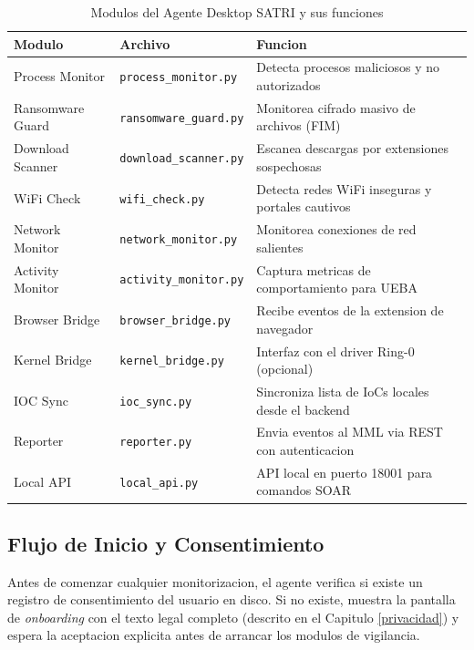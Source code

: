 \documentclass[12pt, a4paper]{report}
\begin{document}
\begin{table}[H]
\centering
\caption{Modulos del Agente Desktop SATRI y sus funciones}
\begin{tabular}{@{}p{3.5cm}p{4cm}p{5cm}@{}}
\toprule
\textbf{Modulo} & \textbf{Archivo} & \textbf{Funcion} \\
\midrule
Process Monitor     & \texttt{process\_monitor.py}   & Detecta procesos maliciosos y no autorizados \\
Ransomware Guard    & \texttt{ransomware\_guard.py}  & Monitorea cifrado masivo de archivos (FIM) \\
Download Scanner    & \texttt{download\_scanner.py}  & Escanea descargas por extensiones sospechosas \\
WiFi Check          & \texttt{wifi\_check.py}        & Detecta redes WiFi inseguras y portales cautivos \\
Network Monitor     & \texttt{network\_monitor.py}   & Monitorea conexiones de red salientes \\
Activity Monitor    & \texttt{activity\_monitor.py}  & Captura metricas de comportamiento para UEBA \\
Browser Bridge      & \texttt{browser\_bridge.py}    & Recibe eventos de la extension de navegador \\
Kernel Bridge       & \texttt{kernel\_bridge.py}     & Interfaz con el driver Ring-0 (opcional) \\
IOC Sync            & \texttt{ioc\_sync.py}          & Sincroniza lista de IoCs locales desde el backend \\
Reporter            & \texttt{reporter.py}           & Envia eventos al MML via REST con autenticacion \\
Local API           & \texttt{local\_api.py}         & API local en puerto 18001 para comandos SOAR \\
\bottomrule
\end{tabular}
\end{table}

\subsection{Flujo de Inicio y Consentimiento}
Antes de comenzar cualquier monitorizacion, el agente verifica si existe un registro de consentimiento del usuario en disco. Si no existe, muestra la pantalla de \textit{onboarding} con el texto legal completo (descrito en el Capitulo \ref{privacidad}) y espera la aceptacion explicita antes de arrancar los modulos de vigilancia.
\end{document}
